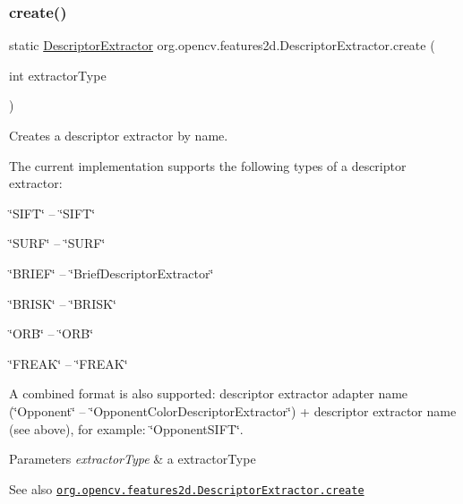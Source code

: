 \subsubsection{\texorpdfstring{create()}{create()}}
{\footnotesize\ttfamily static \mbox{\hyperlink{classorg_1_1opencv_1_1features2d_1_1_descriptor_extractor}{Descriptor\+Extractor}} org.\+opencv.\+features2d.\+Descriptor\+Extractor.\+create (\begin{DoxyParamCaption}\item[{int}]{extractor\+Type }\end{DoxyParamCaption})\hspace{0.3cm}{\ttfamily [static]}}

Creates a descriptor extractor by name.

The current implementation supports the following types of a descriptor extractor\+:


\begin{DoxyItemize}
\item {\ttfamily \char`\"{}\+S\+I\+F\+T\char`\"{}} -- \char`\"{}\+S\+I\+F\+T\char`\"{} 
\item {\ttfamily \char`\"{}\+S\+U\+R\+F\char`\"{}} -- \char`\"{}\+S\+U\+R\+F\char`\"{} 
\item {\ttfamily \char`\"{}\+B\+R\+I\+E\+F\char`\"{}} -- \char`\"{}\+Brief\+Descriptor\+Extractor\char`\"{} 
\item {\ttfamily \char`\"{}\+B\+R\+I\+S\+K\char`\"{}} -- \char`\"{}\+B\+R\+I\+S\+K\char`\"{} 
\item {\ttfamily \char`\"{}\+O\+R\+B\char`\"{}} -- \char`\"{}\+O\+R\+B\char`\"{} 
\item {\ttfamily \char`\"{}\+F\+R\+E\+A\+K\char`\"{}} -- \char`\"{}\+F\+R\+E\+A\+K\char`\"{} 
\end{DoxyItemize}

A combined format is also supported\+: descriptor extractor adapter name ({\ttfamily \char`\"{}\+Opponent\char`\"{}} -- \char`\"{}\+Opponent\+Color\+Descriptor\+Extractor\char`\"{}) + descriptor extractor name (see above), for example\+: {\ttfamily \char`\"{}\+Opponent\+S\+I\+F\+T\char`\"{}}.


\begin{DoxyParams}{Parameters}
{\em extractor\+Type} & a extractor\+Type\\
\hline
\end{DoxyParams}
\begin{DoxySeeAlso}{See also}
\href{http://docs.opencv.org/modules/features2d/doc/common_interfaces_of_descriptor_extractors.html#descriptorextractor-create}{\tt org.\+opencv.\+features2d.\+Descriptor\+Extractor.\+create} 
\end{DoxySeeAlso}
\mbox{\label{classorg_1_1opencv_1_1features2d_1_1_descriptor_extractor_ace3eea1d18bd6aa3a14f2190c9e78d0b}} 
